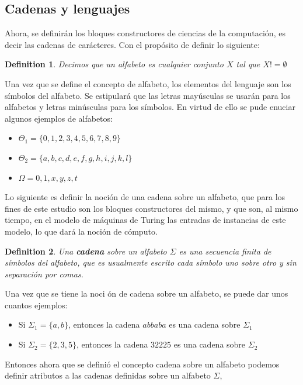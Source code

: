 \documentclass[10pt]{report}
\newtheorem{definition}{Definition}
\begin{document}
    \subsection{Cadenas y lenguajes}\label{sec:Cadenas-y-lenguajes}
    Ahora, se definirán los bloques constructores de ciencias de la computación, es decir las cadenas de carácteres.
    Con el propósito de definir lo siguiente:\space
    \begin{definition}
            Decimos que un alfabeto es cualquier conjunto $X$ tal que $X != \emptyset$
    \end{definition}
    \newline
    Una vez que se define el concepto de alfabeto, los elementos del lenguaje son los símbolos del alfabeto.
    Se estipulará que las letras mayúsculas se usarán para los alfabetos y letras minúsculas para los símbolos.
    En virtud de ello se pude enuciar algunos ejemplos de alfabetos:
    \begin{itemize}
        \item $\Theta_{1} = \{0,1,2,3,4,5,6,7,8,9 \}$
        \item $\Theta_{2} = \{a,b,c,d,e,f,g,h,i,j,k,l \}$
        \item $\Omega = { 0,1,x,y,z,t}$
    \end{itemize}\space
    Lo siguiente es definir la noción de una cadena sobre un alfabeto, que para los fines de este estudio
    son los bloques constructores del mismo, y que son, al mismo tiempo, en el modelo de
    máquinas de Turing las entradas de instancias de este modelo, lo que dará la noción de cómputo.
    \begin{definition}
        Una \textbf{cadena} sobre un alfabeto $\Sigma$ es una secuencia finita de símbolos del alfabeto,
       que es usualmente escrito cada símbolo uno sobre otro y sin separación por comas.
    \end{definition}
    Una vez que se tiene la noci ón de cadena sobre un alfabeto, se puede dar unos cuantos ejemplos:
    \begin{itemize}
        \item Si $\Sigma_{1} = \{a,b\}$, entonces la cadena $abbaba$ es una cadena sobre $\Sigma_{1}$
        \item Si $\Sigma_{2} = \{ 2,3,5 \}$, entonces la cadena $32225$ es una cadena sobre $\Sigma_{2}$
    \end{itemize}
    Entonces ahora que se definió el concepto cadena sobre un alfabeto podemos definir atributos a las cadenas definidas sobre un
    alfabeto $\Sigma$,\newline
\end{document}
